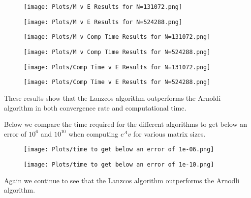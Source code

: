 \documentclass{article}
\begin{document}
\begin{figure}[H]
    \centering
    \begin{minipage}{0.5\textwidth}
       \centering
	  \texttt{[image: Plots/M v E Results for N=131072.png]}
	  \label{fig:MEe7}
    \end{minipage}\hfill
    \begin{minipage}{0.5\textwidth}
       \centering
	  \texttt{[image: Plots/M v E Results for N=524288.png]}
	  \label{fig:MEe6}
    \end{minipage}
\end{figure}
\begin{figure}[H]
    \centering
    \begin{minipage}{0.5\textwidth}
       \centering
	  \texttt{[image: Plots/M v Comp Time Results for N=131072.png]}
	  \label{fig:MEe7}
    \end{minipage}\hfill
    \begin{minipage}{0.5\textwidth}
       \centering
	  \texttt{[image: Plots/M v Comp Time Results for N=524288.png]}
	  \label{fig:MEe6}
    \end{minipage}
\end{figure}
\begin{figure}[H]
    \centering
    \begin{minipage}{0.5\textwidth}
       \centering
	  \texttt{[image: Plots/Comp Time v E Results for N=131072.png]}
	  \label{fig:MEe7}
    \end{minipage}\hfill
    \begin{minipage}{0.5\textwidth}
       \centering
	  \texttt{[image: Plots/Comp Time v E Results for N=524288.png]}
	  \label{fig:MEe6}
    \end{minipage}
\end{figure}
These results show that the Lanzcos algorithm outperforms the Arnoldi algorithm in both convergence rate and computational time.

Below we compare the time required for the different algorithms to get below an error of $10^6$ and $10^{10}$ when computing $e^Av$ for various matrix sizes.
\begin{figure}[H]
\texttt{[image: Plots/time to get below an error of 1e-06.png]}
\end{figure}
\begin{figure}[H]
\texttt{[image: Plots/time to get below an error of 1e-10.png]}
\end{figure}
Again we continue to see that the Lanzcos algorithm outperforms the Arnodli algorithm.
\end{document}

